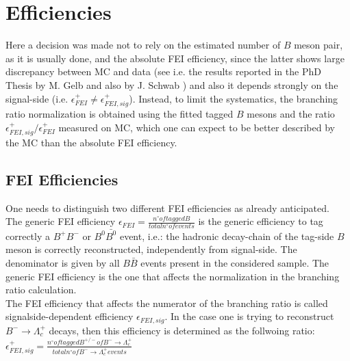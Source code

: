 \chapter{Efficiencies}

Here a decision was made not to rely on the estimated number of $B$ meson pair, as it is usually done, and the absolute FEI efficiency, since the latter shows large discrepancy between MC and data (see i.e. the results reported in the PhD Thesis by M. Gelb \cite{gelb_moritz_2018_21546} and also by J. Schwab \cite{schwab_judith_2017_21422} ) and also it depends strongly on the signal-side (i.e. $\epsilon^{+}_{FEI} \neq \epsilon^{+}_{FEI,  sig}$). 
Instead, to limit the systematics, the branching ratio normalization is obtained using the fitted tagged $B$ mesons and the ratio $\epsilon^{+}_{FEI,  sig} / \epsilon^{+}_{FEI}$ measured on MC, 
which one can expect to be better  described by the MC than the absolute FEI efficiency.

\section{FEI Efficiencies}
One needs to distinguish two different FEI efficiencies as already anticipated. \\

The generic FEI efficiency $\epsilon_{FEI} = \frac{n^\circ of tagged B}{total n^\circ of events}$ is the generic efficiency to tag correctly a $B^+B^-$ or $B^0\bar{B^0}$ event, i.e.: 
the hadronic decay-chain of the tag-side $B$ meson is correctly reconstructed, independently from signal-side. The denominator is given by all $B\bar{B}$ events present in the considered sample. 
The generic FEI efficiency is the one that affects the normalization in the branching ratio calculation.\\

The FEI efficiency that affects the numerator of the branching ratio is called signalside-dependent efficiency $\epsilon_{FEI,  sig}$.
In the case one is trying to reconstruct $B^- \rightarrow \Lambda_c^+$ decays, then this efficiency is determined as the follwoing ratio:
$\epsilon^{+}_{FEI,  sig } = \frac{n^\circ of tagged B^{+/-} of B^- \rightarrow \Lambda_c^+}{total n^\circ of B^- \rightarrow \Lambda_c^+ events}$ 


